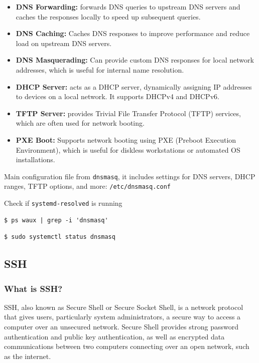 \documentclass{article}
\newenvironment{codetemplate}[1][]{%
  \mybasecolorbox[#1]
  \itshape
}{%
  \endmybasecolorbox
}
\begin{document}
\begin{itemize}
    \item \textbf{DNS Forwarding:} forwards DNS queries to upstream DNS servers and caches the responses locally to speed up subsequent queries.
    \item \textbf{DNS Caching:} Caches DNS responses to improve performance and reduce load on upstream DNS servers.
    \item \textbf{DNS Masquerading:} Can provide custom DNS responses for local network addresses, which is useful for internal name resolution.
    \item \textbf{DHCP Server:} acts as a DHCP server, dynamically assigning IP addresses to devices on a local network. It supports DHCPv4 and DHCPv6.
    \item \textbf{TFTP Server:} provides Trivial File Transfer Protocol (TFTP) services, which are often used for network booting.
    \item \textbf{PXE Boot:} Supports network booting using PXE (Preboot Execution Environment), which is useful for diskless workstations or automated OS installations.
\end{itemize}

Main configuration file from \verb+dnsmasq+, it includes settings for DNS servers, DHCP ranges, TFTP options, and more: \verb|/etc/dnsmasq.conf|

Check if \verb|systemd-resolved| is running
\begin{codetemplate}{}
\begin{verbatim}
$ ps waux | grep -i 'dnsmasq'
\end{verbatim}
\end{codetemplate}
\begin{codetemplate}{}
\begin{verbatim}
$ sudo systemctl status dnsmasq
\end{verbatim}
\end{codetemplate}

\subsection{SSH}

\subsubsection{What is SSH?}

SSH, also known as Secure Shell or Secure Socket Shell, is a network protocol that gives users, particularly system administrators, a secure way to access a computer over an unsecured network.  Secure Shell provides strong password authentication and public key authentication, as well as encrypted data communications between two computers connecting over an open network, such as the internet.
\end{document}
